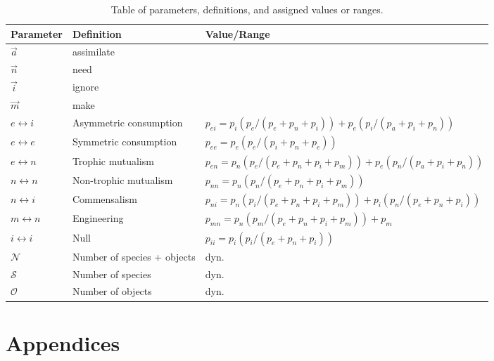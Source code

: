 \documentclass[twocolumn,preprintnumbers,amsmath,amssymb,superscriptaddress]{revtex4}
\begin{document}
\begin{table*}[!t]
\begin{center}
\begin{tabular}{ l l l }
\hline
Parameter & Definition & Value/Range \\
\hline
$\overrightarrow{a}$ & assimilate & \\
$\overrightarrow{n}$ & need & \\
$\overrightarrow{i}$ & ignore & \\
$\overrightarrow{m}$ & make & \\
\hline
$e \leftrightarrow i$ & Asymmetric consumption & $p_{ei} = p_i(p_e/(p_e+p_n+p_i)) + p_e(p_i/(p_a+p_i+p_n))$ \\
$e \leftrightarrow e$ & Symmetric consumption & $p_{ee} = p_e(p_e/(p_i+p_n+p_e))$\\
$e \leftrightarrow n$ & Trophic mutualism & $p_{en} = p_n(p_e/(p_e+p_n+p_i+p_m)) + p_e(p_n/(p_a+p_i+p_n))$ \\
$n \leftrightarrow n$ & Non-trophic mutualism & $p_{nn} = p_n(p_n/(p_e+p_n+p_i+p_m))$ \\
$n \leftrightarrow i$ & Commensalism & $p_{ni} = p_n(p_i/(p_e+p_n+p_i+p_m)) + p_i(p_n/(p_e+p_n+p_i))$\\
$m \leftrightarrow n$ & Engineering & $p_{mn} = p_n(p_m/(p_e+p_n+p_i+p_m)) + p_m$\\
$i \leftrightarrow i$ & Null & $p_{ii} = p_i(p_i/(p_e+p_n+p_i))$\\
\hline
$\mathcal{N}$ & Number of species + objects & dyn.\\
$\mathcal{S}$ & Number of species & dyn.\\
$\mathcal{O}$ & Number of objects & dyn.\\
\hline
\end{tabular}
\end{center}
\caption{Table of parameters, definitions, and assigned values or ranges.}
\label{table:param}
\end{table*}








\section*{Appendices}
\end{document}
